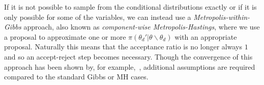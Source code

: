 If it is not possible to sample from the conditional distributions exactly or if it is only
possible for some of the variables, we can instead use a \emph{Metropolis-within-Gibbs} approach,
also known as \emph{component-wise Metropolis-Hastings}, where
we use a proposal to approximate one or more $\pi(\theta_d' | \theta \backslash \theta_d)$ with an
appropriate proposal.  Naturally this means that the acceptance ratio is no longer always $1$ and so
an accept-reject step becomes necessary.  Though the convergence of this approach has
been shown by, for example,~\cite{jones2014convergence}, additional assumptions are required compared to the
standard Gibbs or MH cases.